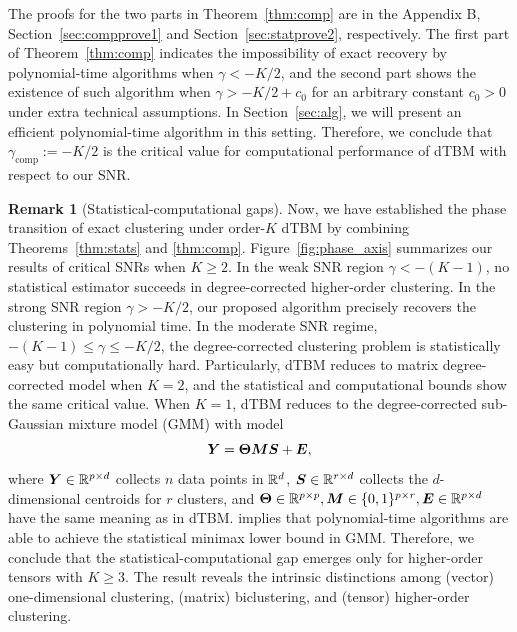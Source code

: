 \documentclass[journal]{IEEEtran}
\theoremstyle{definition}
\theoremstyle{definition}
\newtheorem{rmk}{Remark}
\begin{document}
The proofs for the two parts in Theorem~\ref{thm:comp} are in the Appendix B, Section~\ref{sec:compprove1} and Section~\ref{sec:statprove2}, respectively. The first part of Theorem~\ref{thm:comp} indicates the impossibility of exact recovery by polynomial-time algorithms when $\gamma < -K/2$, and the second part shows the existence of such algorithm when {$\gamma > -K/2+c_0$  for an arbitrary constant $c_0 > 0$} under extra technical assumptions. In Section~\ref{sec:alg}, we will present an efficient polynomial-time algorithm in this setting. Therefore, we conclude that $\gamma_{\text{comp}}:=-K/2$ is the critical value for computational performance of dTBM with respect to our SNR. 

\begin{rmk}[Statistical-computational gaps]
Now, we have established the phase transition of exact clustering under order-$K$ dTBM by combining Theorems~\ref{thm:stats} and \ref{thm:comp}. Figure~\ref{fig:phase_axis} summarizes our results of critical SNRs when $K \geq 2$. In the weak SNR region $\gamma < -(K-1)$, no statistical estimator succeeds in degree-corrected higher-order clustering. In the strong SNR region $\gamma  > -K/2$, our proposed algorithm precisely recovers the clustering in polynomial time. In the moderate SNR regime, $-(K-1)\leq \gamma \leq -K/2$, the degree-corrected clustering problem is statistically easy but computationally hard. Particularly, dTBM reduces to matrix degree-corrected model when $K =2$, and the statistical and computational bounds show the same critical value. When $K =1$, dTBM reduces to the degree-corrected sub-Gaussian mixture model (GMM) with model
\begin{equation}
    \bm Y = \boldsymbol{\Theta} \bm M \bm S + \bm{E},
\end{equation}
where $\bm Y \in \mathbb{R}^{p \times d}$ collects $n$ data points in $\mathbb{R}^d$, $\bm S \in \mathbb{R}^{r \times d}$ collects the $d$-dimensional centroids for $r$ clusters, and $\boldsymbol{\Theta} \in \mathbb{R}^{p \times p}, \bm M \in \{0,1\}^{p \times r}, \bm{E} \in \mathbb{R}^{p \times d}$ have the same meaning as in dTBM. \cite{lu2016statistical} implies that polynomial-time algorithms are able to achieve the statistical minimax lower bound in GMM. Therefore, we conclude that the statistical-computational gap emerges only for higher-order tensors with $K \geq 3$. The result reveals the intrinsic distinctions among (vector) one-dimensional clustering, (matrix) biclustering, and (tensor) higher-order clustering. 
\end{rmk}
\end{document}
